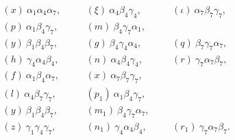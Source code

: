\documentclass[11pt,a4paper]{article}
\theoremstyle{definition}
\begin{document}
\begin{align*}
&(x)\ \alpha_{1}\alpha_{4}\alpha_{7}, \quad &&(\xi)\ \alpha_{4}\beta_{4}\gamma_{4}, \quad &&(\iota)\ \alpha_{7}\beta_{7}\gamma_{7}, \\
&(p)\ \alpha_{1}\beta_{4}\gamma_{7}, \quad &&(m)\ \beta_{4}\gamma_{7}\alpha_{1}, \\
&(y)\ \beta_{1}\beta_{4}\beta_{7}, \quad &&(g)\ \beta_{4}\gamma_{4}\alpha_{4}, \quad &&(q)\ \beta_{7}\gamma_{7}\alpha_{7}, \\
&(h)\ \gamma_{4}\alpha_{4}\beta_{4}, \quad &&(n)\ \alpha_{4}\beta_{4}\gamma_{4}, \quad &&(r)\ \gamma_{7}\alpha_{7}\beta_{7}, \\
&(f)\ \alpha_{1}\beta_{4}\alpha_{7}, \quad &&(x)\ \alpha_{7}\beta_{7}\gamma_{7}, \\
&(l)\ \alpha_{4}\beta_{7}\gamma_{7}, \quad &&(p_{1})\ \alpha_{1}\beta_{4}\gamma_{7}, \\
&(y)\ \beta_{1}\beta_{4}\beta_{7}, \quad &&(m_{1})\ \beta_{4}\gamma_{7}\alpha_{7}, \\
&(z)\ \gamma_{1}\gamma_{4}\gamma_{7}, \quad &&(n_{1})\ \gamma_{4}\alpha_{4}\beta_{4}, \quad &&(r_{1})\ \gamma_{7}\alpha_{7}\beta_{7}.
\end{align*}
\end{document}
